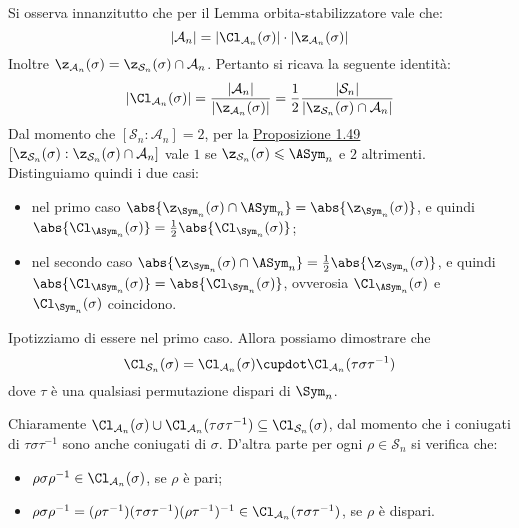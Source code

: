 \documentclass[11pt]{scrartcl}
\begin{document}
	
	Si osserva innanzitutto che per il Lemma orbita-stabilizzatore vale che:
	\[ \lvert \mathcal{A}_n \rvert = \lvert \Cl_{\mathcal{A}_n}(\sigma)\rvert \cdot \lvert \z_{\mathcal{A}_n}(\sigma) \rvert \]
	Inoltre $\z_{\mathcal{A}_n}(\sigma) = \z_{\mathcal{S}_n}(\sigma) \cap \mathcal{A}_n$.
	Pertanto si ricava la seguente identità:
	\[
	\lvert \Cl_{\mathcal{A}_n}(\sigma) \rvert = \frac{\lvert\mathcal{A}_n\rvert}{\lvert \z_{\mathcal{A}_n}(\sigma) \rvert} =
	\frac 1 2 \frac{\lvert \mathcal{S}_n \rvert}{\lvert \z_{\mathcal{S}_n}(\sigma) \cap \mathcal{A}_n \rvert}
	\]
	Dal momento che $[\mathcal{S}_n:\mathcal{A}_n] = 2$, per la \hyperref[prop1.49]{Proposizione 1.49}
	$[\z_{\mathcal{S}_n}(\sigma): \z_{\mathcal{S}_n}(\sigma) \cap \mathcal{A}_n]$ vale
	$1$ se $\z_{\mathcal{S}_n}(\sigma) \leqslant \ASym_n$ e $2$
	altrimenti. Distinguiamo quindi i due casi:
	\begin{itemize}
		\item nel primo caso $\abs{\z_{\Sym_n}(\sigma) \cap \ASym_n} = \abs{\z_{\Sym_n}(\sigma)}$, e quindi $\abs{\Cl_{\ASym_n}(\sigma)} = \frac{1}{2} \abs{\Cl_{\Sym_n}(\sigma)}$;
		\item nel secondo caso $\abs{\z_{\Sym_n}(\sigma) \cap \ASym_n} = \frac{1}{2}\abs{\z_{\Sym_n}(\sigma)}$, e quindi $\abs{\Cl_{\ASym_n}(\sigma)} = \abs{\Cl_{\Sym_n}(\sigma)}$, ovverosia $\Cl_{\ASym_n}(\sigma)$ e
		$\Cl_{\Sym_n}(\sigma)$ coincidono.
	\end{itemize}

	Ipotizziamo di essere nel primo caso. Allora possiamo dimostrare che \[ \Cl_{\mathcal{S}_n}(\sigma) = \Cl_{\mathcal{A}_n}(\sigma) \cupdot
	\Cl_{\mathcal{A}_n}(\tau\sigma\tau^{-1}) \]
	dove $\tau$ è una qualsiasi permutazione dispari di $\Sym_n$. \medskip
	

	Chiaramente $\Cl_{\mathcal{A}_n}(\sigma) \cup \Cl_{\mathcal{A}_n}(\tau\sigma\tau^{-1})
	\subseteq \Cl_{\mathcal{S}_n}(\sigma)$, dal momento che i coniugati di $\tau\sigma\tau^{-1}$ sono anche
	coniugati di $\sigma$. D'altra parte per ogni $\rho \in \mathcal{S}_n$ si verifica che:
	
	\begin{itemize}
		\item $\rho\sigma\rho^{-1} \in \Cl_{\mathcal{A}_n}(\sigma)$, se $\rho$ è pari;
		\item 	$\rho\sigma\rho^{-1} = (\rho\tau^{-1})(\tau\sigma\tau^{-1})(\rho\tau^{-1})^{-1}
		\in \Cl_{\mathcal{A}_n}(\tau\sigma\tau^{-1})$, se $\rho$ è dispari.
	\end{itemize}
	
\end{document}
